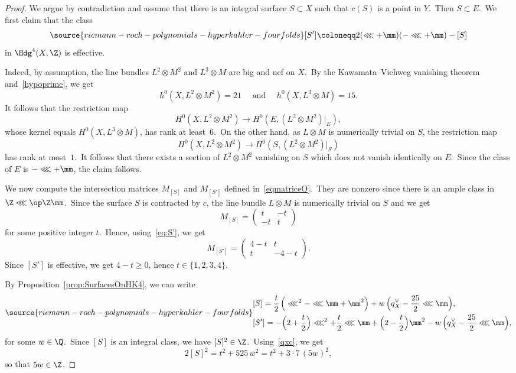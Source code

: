 \begin{proof}
We argue by contradiction and assume that there is an integral surface $S\subset X$ such that $c(S)$ is a point in $Y$.\ Then $S\subset E$.\ We first claim that the class
\begin{equation}\label{eq:S'}
\source{riemann-roch-polynomials-hyperkahler-fourfolds}
[S'] \coloneqq 2(\lll+\mm)(-\lll+\mm) - [S]
\end{equation}
in ${\Hdg}^4(X,\Z)$ is effective.

Indeed, by assumption, the line bundles $L^2\otimes M^2$ and $L^3\otimes M$ are big and nef on $X$.\ By the Kawamata--Viehweg vanishing theorem and~\eqref{hypoprime}, we get
\[
h^0(X, L^2\otimes M^2)=21\quad\text{ and }\quad h^0(X, L^3\otimes M)=15.
\]
It follows that the restriction map
\[
H^0(X,L^2\otimes M^2)\rightarrow H^0(E,(L^2\otimes M^2)\vert_E),
\]
whose kernel equals $H^0(X,L^3\otimes M)$, has rank at least~$6$.\
On the other hand, as $L\otimes M$ is numerically trivial on $S$, the restriction map
\[
H^0(X,L^2\otimes M^2)\rightarrow H^0(S,(L^2\otimes M^2)\vert_S)
\]
has rank at most~$1$.\
It follows that  there exists a section of $L^2\otimes M^2$ vanishing on $S$ which does not vanish identically on $E$.\
Since the class of $E$ is $-\lll+\mm$, the claim follows.

We now compute the  intersection matrices $M_{[S]}$ and $M_{[S']}$ defined in~\eqref{eqmatriceO}.\ They are nonzero since there is an ample class  in $\Z\lll\op\Z\mm$.\
Since the surface $S$ is contracted by $c$, the line bundle $L\otimes M$ is numerically trivial on $S$ and we get
\[
M_{[S]}=
\begin{pmatrix}
t & -t \\
-t & t
\end{pmatrix}
\]
for some positive integer $t$.\
Hence, using~\eqref{eq:S'}, we get
\[
M_{[S']}=
\begin{pmatrix}
4-t & t \\
t & -4-t
\end{pmatrix}.
\]
Since $[S']$ is effective, we get $4-t\geq0$, hence $t\in\{1,2,3,4\}$.

By Proposition~\ref{prop:SurfacesOnHK4}, we can write
\begin{equation}\label{eq:Paris20211103}
\source{riemann-roch-polynomials-hyperkahler-fourfolds}
\begin{split}
    &[S] = \frac t2\, \Big( \lll^2 -\lll\mm + \mm^2 \Big) +   w\,\Big(q_X^\vee - \frac{25}{2} \lll\mm \Big), \\
    &[S'] = -\Big(2+ \frac t2 \Big)\lll^2 + \frac t2 \lll\mm + \Big(2 - \frac t2 \Big)\mm^2 -   w\,\Big(q_X^\vee - \frac{25}{2} \lll\mm \Big),
\end{split}
\end{equation}
for some $w\in\Q$.\
Since $[S]$ is an integral class, we have $[S]^2\in\Z$.\
Using~\eqref{qxc}, we get
\[
2[S]^2 =   t^2 + 525\, w^2=t^2 + 3\cdot  7\, (5w)^2,
\]
so that $5w\in\Z$.


\end{proof}
